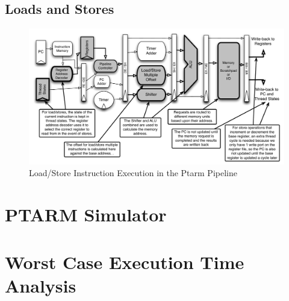 \subsection{Loads and Stores}
\begin{figure}
  \vspace{-20pt}
  \begin{center}
    \includegraphics[scale=.6]{figs/ldstr_pipeline_implementation}
  \end{center}
  \vspace{-20pt}
  \caption{Load/Store Instruction Execution in the Ptarm Pipeline}
  \label{fig:ldstr_pipeline_implementation}
\end{figure}

\section{PTARM Simulator}
\label{sec:ptarm_sim}

\section{Worst Case Execution Time Analysis}
\label{sec:wcet}




